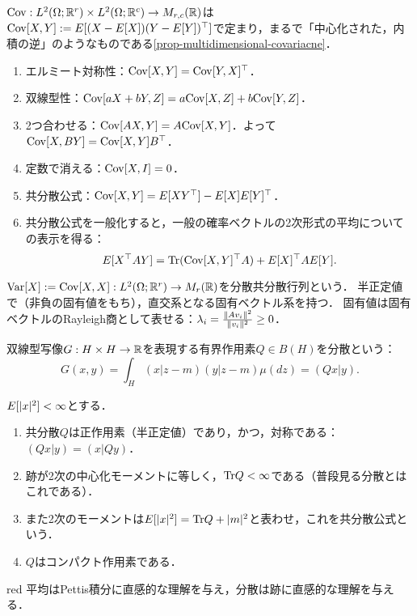 \documentclass[uplatex,dvipdfmx]{jsreport}
\begin{document}
$\mathrm{Cov}:L^2(\Omega;\mathbb{R}^r)\times L^2(\Omega;\mathbb{R}^c)\to M_{r,c}(\mathbb{R})$は$\mathrm{Cov}[X,Y]:=E[(X-E[X])(Y-E[Y])^\top]$で定まり，まるで「中心化された，内積の逆」のようなものである\ref{prop-multidimensional-covariacne}．
\begin{enumerate}
    \item エルミート対称性：$\mathrm{Cov}[X,Y]=\mathrm{Cov}[Y,X]^\top$．
    \item 双線型性：$\mathrm{Cov}[aX+bY,Z]=a\mathrm{Cov}[X,Z]+b\mathrm{Cov}[Y,Z]$．
    \item 2つ合わせる：$\mathrm{Cov}[AX,Y]=A\mathrm{Cov}[X,Y]$．よって$\mathrm{Cov}[X,BY]=\mathrm{Cov}[X,Y]B^\top$．
    \item 定数で消える：$\mathrm{Cov}[X,I]=0$．
    \item 共分散公式：$\mathrm{Cov}[X,Y]=E[XY^\top]-E[X]E[Y]^\top$．
    \item 共分散公式を一般化すると，一般の確率ベクトルの2次形式の平均についての表示を得る：
    \[E[X^\top AY]=\mathrm{Tr}(\mathrm{Cov}[X,Y]^\top A)+E[X]^\top AE[Y].\]
\end{enumerate}

$\mathrm{Var}[X]:=\mathrm{Cov}[X,X]:L^2(\Omega;\mathbb{R}^r)\to M_r(\mathbb{R})$を分散共分散行列という．
半正定値で（非負の固有値をもち），直交系となる固有ベクトル系を持つ．
固有値は固有ベクトルのRayleigh商として表せる：$\lambda_i=\frac{\|Av_i\|^2}{\|v_i\|^2}\ge0$．

\begin{definition}
    双線型写像$G:H\times H\to\mathbb{R}$を表現する有界作用素$Q\in B(H)$を分散という：
    \[G(x,y)=\int_H(x|z-m)(y|z-m)\mu(dz)=(Qx|y).\]
\end{definition}
\begin{proposition}
    $E[\lvert x\rvert^2]<\infty$とする．
    \begin{enumerate}
        \item 共分散$Q$は正作用素（半正定値）であり，かつ，対称である：$(Qx|y)=(x|Qy)$．
        \item 跡が2次の中心化モーメントに等しく，$\mathrm{Tr} Q<\infty$である（普段見る分散とはこれである）．
        \item また2次のモーメントは$E[\lvert x\rvert^2]=\mathrm{Tr} Q+\lvert m\rvert^2$と表わせ，これを共分散公式という．
        \item $Q$はコンパクト作用素である．
    \end{enumerate}
\end{proposition}

\begin{tbox}{red}{}
    平均はPettis積分に直感的な理解を与え，分散は跡に直感的な理解を与える．
\end{tbox}
\end{document}
